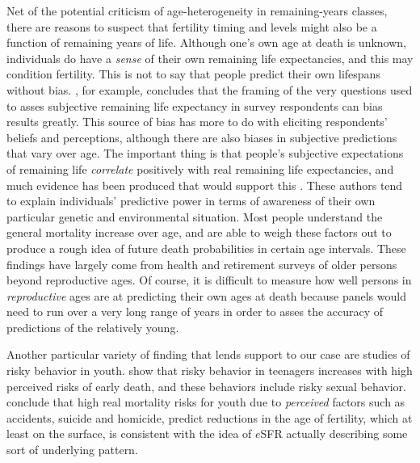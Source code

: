 Net of the potential criticism of age-heterogeneity in remaining-years classes,
there are reasons to suspect that fertility timing and levels might also be
a function of remaining years of life. Although one's own age at death is
unknown, individuals do have a \textit{sense} of their own remaining life
expectancies, and this may condition fertility. This is not to say that people 
predict their own lifespans without bias. \citet{payne2013life}, for example,
concludes that the framing of the very questions used to asses subjective
remaining life expectancy in survey respondents can bias results greatly. This
source of bias has more to do with eliciting respondents' beliefs and
perceptions, although there are also biases in subjective predictions that vary
over age. The important thing is that people's subjective expectations of
remaining life \textit{correlate} positively with real remaining life
expectancies, and much evidence has been produced that would support
this \citep{hurd1995evaluation, mirowsky1999subjective, hurd2002predictive,
perozek2008using, delavande2011differential, post2012longevity}. These authors
tend to explain individuals' predictive power in terms of awareness of
their own particular genetic and environmental situation. Most people
understand the general mortality increase over age, and are able to
weigh these factors out to produce a rough idea of future death 
probabilities in certain age intervals. These findings have largely come from
health and retirement surveys of older persons beyond reproductive ages. Of
course, it is difficult to measure how well persons in \textit{reproductive}
ages are at predicting their own ages at death because panels would need to
run over a very long range of years in order to asses the accuracy of
predictions of the relatively young. 

Another particular variety of finding that lends support to our case are studies
of risky behavior in youth. \citet{borowsky2009health} show that risky behavior
in teenagers increases with high perceived risks of early death, and these
behaviors include risky sexual behavior. \citet{wilson1997life} conclude that
high real mortality risks for youth due to \textit{perceived} factors such as 
accidents, suicide and homicide, predict reductions in the age of fertility, which at
least on the surface, is consistent with the idea of $e$SFR actually describing 
some sort of underlying pattern. 

